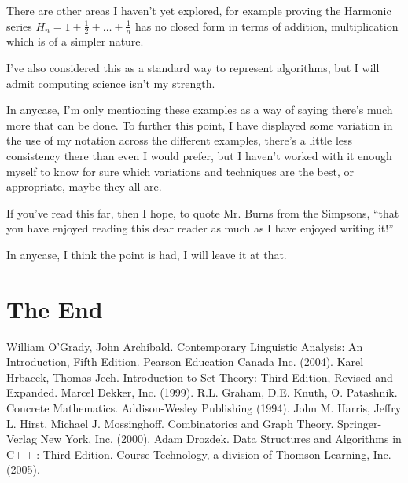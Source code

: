\documentclass[twoside]{article}
\begin{document}
There are other areas I haven't yet explored, for example proving the Harmonic series
$ H_n=1+\frac{1}{2}+\ldots+\frac{1}{n} $ has no closed form in terms of addition, multiplication which is of a simpler
nature.

I've also considered this as a standard way to represent algorithms, but I will admit computing science isn't my
strength.

In anycase, I'm only mentioning these examples as a way of saying there's much more that can be done.  To further this
point, I have displayed some variation in the use of my notation across the different examples, there's a little less
consistency there than even I would prefer, but I haven't worked with it enough myself to know for sure which variations
and techniques are the best, or appropriate, maybe they all are.

If you've read this far, then I hope, to quote Mr. Burns from the Simpsons,
``that you have enjoyed reading this dear reader as much as I have enjoyed writing it!''

In anycase, I think the point is had, I will leave it at that.

\section*{\center The End}

\begin{thebibliography}{99}
	William O'Grady, John Archibald.  Contemporary Linguistic Analysis:
		An Introduction, Fifth Edition.  Pearson Education Canada Inc. (2004).
	Karel Hrbacek, Thomas Jech.  Introduction to Set Theory:
		Third Edition, Revised and Expanded.  Marcel Dekker, Inc. (1999).
	R.L. Graham, D.E. Knuth, O. Patashnik.  Concrete
		Mathematics.  Addison-Wesley Publishing (1994).
	John M. Harris, Jeffry L. Hirst, Michael J. Mossinghoff.  Combinatorics and Graph Theory.
		Springer-Verlag New York, Inc. (2000).
	Adam Drozdek.  Data Structures and Algorithms in C$ ++ $: Third Edition.  Course Technology,
		a division of Thomson Learning, Inc.  (2005).
\end{thebibliography}
\end{document}
